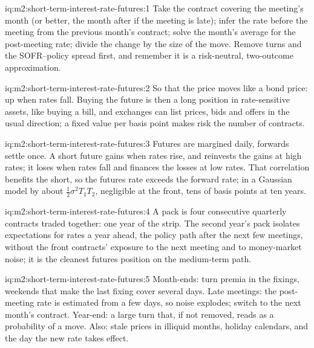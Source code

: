 \begin{solution}{iq:m2:short-term-interest-rate-futures:1}
Take the contract covering the meeting's month (or better, the month after if
the meeting is late); infer the rate before the meeting from the previous
month's contract; solve the month's average for the post-meeting rate; divide
the change by the size of the move. Remove turns and the SOFR--policy spread
first, and remember it is a risk-neutral, two-outcome approximation.
\end{solution}

\begin{solution}{iq:m2:short-term-interest-rate-futures:2}
So that the price moves like a bond price: up when rates fall. Buying the
future is then a long position in rate-sensitive assets, like buying a bill,
and exchanges can list prices, bids and offers in the usual direction; a fixed
value per basis point makes risk the number of contracts.
\end{solution}

\begin{solution}{iq:m2:short-term-interest-rate-futures:3}
Futures are margined daily, forwards settle once. A short future gains when
rates rise, and reinvests the gains at high rates; it loses when rates fall and
finances the losses at low rates. That correlation benefits the short, so the
futures rate exceeds the forward rate; in a Gaussian model by about
$\frac12\sigma^2 T_1 T_2$, negligible at the front, tens of basis points at ten years.
\end{solution}

\begin{solution}{iq:m2:short-term-interest-rate-futures:4}
A pack is four consecutive quarterly contracts traded together: one year of
the strip. The second year's pack isolates expectations for rates a year ahead,
the policy path after the next few meetings, without the front contracts'
exposure to the next meeting and to money-market noise; it is the cleanest
futures position on the medium-term path.
\end{solution}

\begin{solution}{iq:m2:short-term-interest-rate-futures:5}
Month-ends: turn premia in the fixings, weekends that make the last fixing
cover several days. Late meetings: the post-meeting rate is estimated from a
few days, so noise explodes; switch to the next month's contract. Year-end: a
large turn that, if not removed, reads as a probability of a move. Also: stale
prices in illiquid months, holiday calendars, and the day the new rate takes
effect.
\end{solution}

